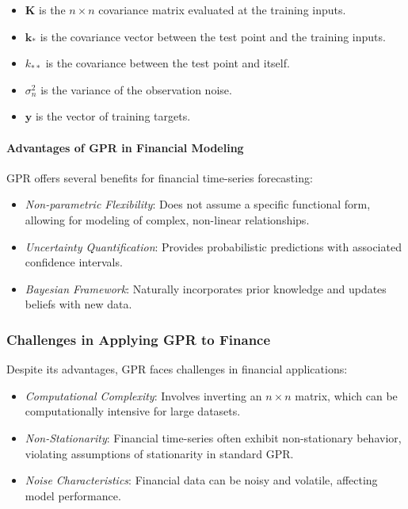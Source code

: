 \begin{itemize}
    \item $\mathbf{K}$ is the $n \times n$ covariance matrix evaluated at the training inputs.
    \item $\mathbf{k}_*$ is the covariance vector between the test point and the training inputs.
    \item $k_{**}$ is the covariance between the test point and itself.
    \item $\sigma_n^2$ is the variance of the observation noise.
    \item $\mathbf{y}$ is the vector of training targets.
\end{itemize}

\paragraph{Advantages of GPR in Financial Modeling}

GPR offers several benefits for financial time-series forecasting:

\begin{itemize}
    \item \textit{Non-parametric Flexibility}: Does not assume a specific functional form, allowing for modeling of complex, non-linear relationships.
    \item \textit{Uncertainty Quantification}: Provides probabilistic predictions with associated confidence intervals.
    \item \textit{Bayesian Framework}: Naturally incorporates prior knowledge and updates beliefs with new data.
\end{itemize}

\subsubsection{Challenges in Applying GPR to Finance}

Despite its advantages, GPR faces challenges in financial applications:

\begin{itemize}
    \item \textit{Computational Complexity}: Involves inverting an $n \times n$ matrix, which can be computationally intensive for large datasets.
    \item \textit{Non-Stationarity}: Financial time-series often exhibit non-stationary behavior, violating assumptions of stationarity in standard GPR.
    \item \textit{Noise Characteristics}: Financial data can be noisy and volatile, affecting model performance.
\end{itemize}

